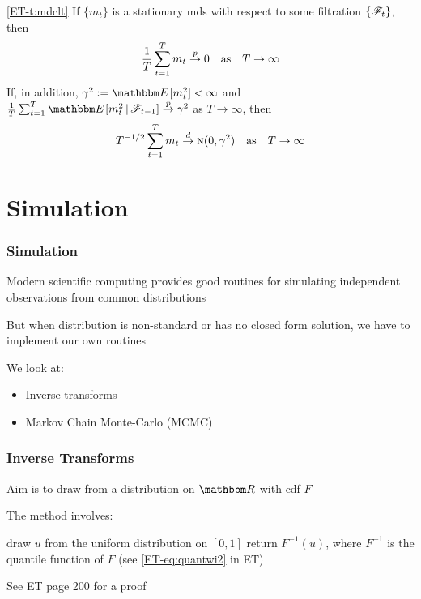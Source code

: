 \begin{frame}
    
    \vspace{2em}
    \Thm \textcolor{Brown}{{\eqref{ET-t:mdclt}}}
        If $\{m_t\}$ is a stationary {\sc mds} with respect to
        some filtration $\{\mathscr F_t\}$, then
        \begin{equation*}
            \label{eq:mdlln}
            \frac{1}{T} \sum_{t=1}^T m_t \stackrel { p } {\to} 0
            \quad \text{as} \quad
            T \to \infty
        \end{equation*}
        If, in addition, $\gamma^2 := \EE[m_t^2] < \infty$ and
            $\frac{1}{T} \sum_{t=1}^T \EE[m_t^2 \given \fF_{t-1} ] 
            \toprob \gamma^2
            $ as $T \to \infty$,  then 
        \begin{equation*}
            \label{eq:mdclt}
            T^{-1/2}  \sum_{t=1}^T m_t
            \stackrel { d } {\to} \textrm{\sc n}(0, \gamma^2)
            \quad \text{as} \quad
            T \to \infty
        \end{equation*}
    
\end{frame}

\section{Simulation}

\begin{frame}\frametitle{Simulation}

    \vspace{2em}
    Modern scientific computing provides good routines for simulating independent
    observations from common distributions 
    
    But when distribution is non-standard or has no closed form solution, we have
    to implement our own routines 
    
    \vspace{1em}
    We look at:
    \begin{itemize}
        \item Inverse transforms
        \item Markov Chain Monte-Carlo (MCMC)
    \end{itemize}
    
\end{frame}
    
\begin{frame}\frametitle{Inverse Transforms}

     \vspace{2em}
    Aim is to draw from a distribution on $\RR$ with {\sc cdf} $F$
    
    The  method involves:
    \vspace{0.6em}
    \begin{algorithmic}[1]
        \State draw $u$ from the uniform distribution on $[0, 1]$
        \State return $F^{-1}(u)$, where $F^{-1}$ is the quantile function of $F$
            (see \eqref{ET-eq:quantwi2} in ET)
    \end{algorithmic}
    See ET page 200 for a proof
    
\end{frame}
    
